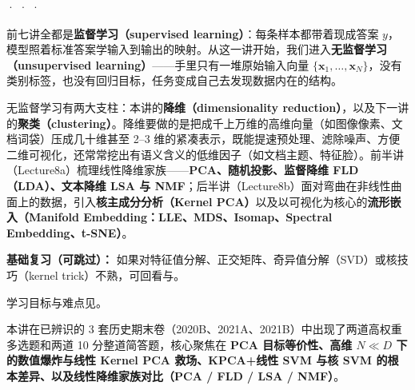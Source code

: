 



 ·  ·  · 

前七讲全都是\textbf{监督学习（supervised learning）}：每条样本都带着现成答案 $y$，模型照着标准答案学输入到输出的映射。从这一讲开始，我们进入\textbf{无监督学习（unsupervised learning）}——手里只有一堆原始输入向量 $\{\mathbf{x}_1,\dots,\mathbf{x}_N\}$，没有类别标签，也没有回归目标，任务变成自己去发现数据内在的结构。

无监督学习有两大支柱：本讲的\textbf{降维（dimensionality reduction）}，以及下一讲的\textbf{聚类（clustering）}。降维要做的是把成千上万维的高维向量（如图像像素、文档词袋）压成几十维甚至 2–3 维的紧凑表示，既能提速预处理、滤除噪声、方便二维可视化，还常常挖出有语义含义的低维因子（如文档主题、特征脸）。前半讲（Lecture8a）梳理线性降维家族——\textbf{PCA、随机投影、监督降维 FLD（LDA）、文本降维 LSA 与 NMF}；后半讲（Lecture8b）面对弯曲在非线性曲面上的数据，引入\textbf{核主成分分析（Kernel PCA）}以及以可视化为核心的\textbf{流形嵌入（Manifold Embedding：LLE、MDS、Isomap、Spectral Embedding、t-SNE）}。

\textbf{基础复习（可跳过）：} 如果对特征值分解、正交矩阵、奇异值分解（SVD）或核技巧（kernel trick）不熟，可回看与。

学习目标与难点见。



本讲在已辨识的 3 套历史期末卷（2020B、2021A、2021B）中出现了两道高权重多选题和两道 10 分整道简答题，核心聚焦在 \textbf{PCA 目标等价性、高维 $N\ll D$ 下的数值爆炸与线性 Kernel PCA 救场、KPCA+线性 SVM 与核 SVM 的根本差异、以及线性降维家族对比（PCA / FLD / LSA / NMF）}。

